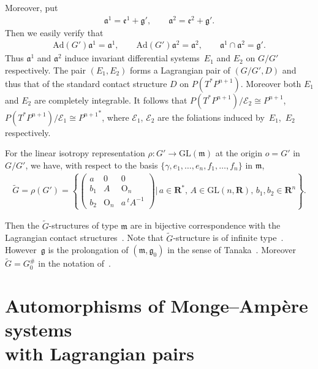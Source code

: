 \documentclass[11pt]{article}
\begin{document}
Moreover, put
\begin{gather*}
\mathfrak{a}^1=\mathfrak{e}^1+\mathfrak{g}', \qquad
\mathfrak{a}^2=\mathfrak{e}^2+\mathfrak{g}'.
\end{gather*}
Then we easily verify that
\begin{gather*}
\mathrm{Ad}(G')\mathfrak{a}^1=\mathfrak{a}^1, \qquad
\mathrm{Ad}(G')\mathfrak{a}^2=\mathfrak{a}^2,\qquad
\mathfrak{a}^1\cap \mathfrak{a}^2=\mathfrak{g}'.
\end{gather*}
Thus $\mathfrak{a}^1$ and $\mathfrak{a}^2$ induce invariant
dif\/ferential systems~$E_1$ and $E_2$ on $G/G'$ respectively.
The pair $(E_1,E_2)$ forms
a Lagrangian pair of $(G/G', D)$ and thus
that of the standard contact structure $D$ on $P(T^*P^{n+1})$.
Moreover
both $E_1$ and $E_2$ are completely integrable.
It follows that
$P(T^*P^{n+1})/\mathcal{E}_2\cong P^{n+1}$, $P(T^*P^{n+1})/\mathcal{E}_1
\cong {P^{n+1}}^*$,
where
$\mathcal{E}_1$, $\mathcal{E}_2$ are the foliations induced by~$E_1$,~$E_2$
respectively.

For the linear isotropy representation
$\rho \colon  G' \longrightarrow \mathrm{GL}(\mathfrak{m})$ at the origin
$o = G'$ in $G/G'$,
we have, with respect to the basis $\{ \gamma, e_1, \dots, e_n, f_1, \dots, f_n \}$ in $\mathfrak{m}$,
\begin{gather*}
\tilde{G} =\rho(G')
          =\left\{{\begin{pmatrix}
                      a & 0 & 0 \\
                      b_1 & A & \mathrm{O}_n \\
                      b_2 & \mathrm{O}_n & a\, {}^t\! A^{-1}
                    \end{pmatrix}} \Bigg\vert \,
a\in \mathbf{R}^*,\, A\in \mathrm{GL}(n,{\mathbf{R}}), \,b_1, b_2\in \mathbf{R}^n
\right\}.
\end{gather*}

Then the $\tilde{G}$-structures of type $\mathfrak{m}$ are in bijective
correspondence with the Lagrangian contact structures~\cite[Theorem~5.1]{Tak}.
Note that $\tilde{G}$-structure is of inf\/inite type~\cite[Chapter~I]{K}.
How\-ever~${\mathfrak g}$ is the prolongation of $({\mathfrak m}, {\mathfrak g}_0)$
in the sense of Tanaka~\cite{Tan1,Y}. Moreover
$\tilde{G} = G_0^{\#}$ in the notation of~\cite{Tan}.
\setcounter{section}{4}
\setcounter{subsection}{0}
\setcounter{subsubsection}{0}
\setcounter{Th}{5}
\setcounter{equation}{0}
\section[Automorphisms of Monge-Amp{\`e}re systems with Lagrangian pairs]{Automorphisms of Monge--Amp{\`e}re systems\\ with Lagrangian pairs}
\label{Automorphisms}
\end{document}
